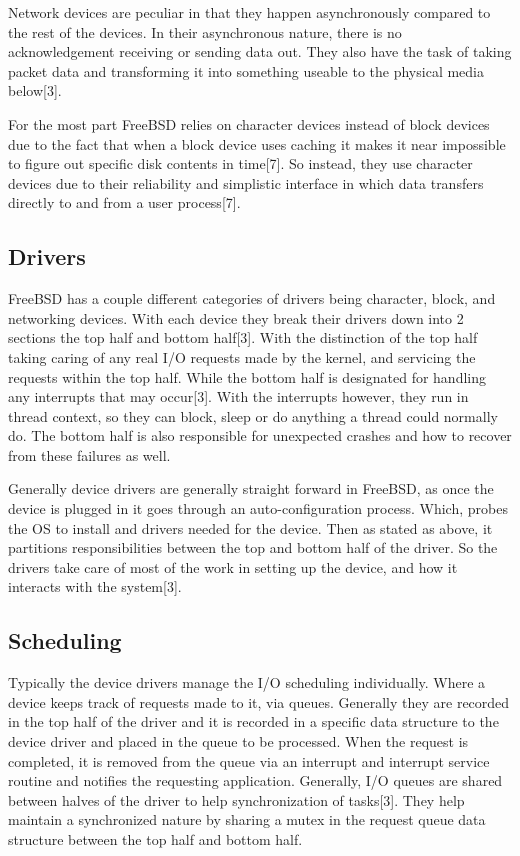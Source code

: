 \documentclass{article}
\begin{document}
    Network devices are peculiar in that they happen asynchronously compared to the rest of the devices. In their asynchronous nature, there is no acknowledgement receiving or sending data out. They also have the task of taking packet data and transforming it into something useable to the physical media below[3].

    For the most part FreeBSD relies on character devices instead of block devices due to the fact that when a block device uses caching it makes it near impossible to figure out specific disk contents in time[7]. So instead, they use character devices due to their reliability and simplistic interface in which data transfers directly to and from a user process[7].
\subsection{Drivers}
    FreeBSD has a couple different categories of drivers being character, block, and networking devices. With each device they break their drivers down into 2 sections the top half and bottom half[3]. With the distinction of the top half taking caring of any real I/O requests made by the kernel, and servicing the requests within the top half. While the bottom half is designated for handling any interrupts that may occur[3]. With the interrupts however, they run in thread context, so they can block, sleep or do anything a thread could normally do. The bottom half is also responsible for unexpected crashes and how to recover from these failures as well.

    Generally device drivers are generally straight forward in FreeBSD, as once the device is plugged in it goes through an auto-configuration process. Which, probes the OS to install and drivers needed for the device. Then as stated as above, it partitions responsibilities between the top and bottom half of the driver. So the drivers take care of most of the work in setting up the device, and how it interacts with the system[3].

\subsection{Scheduling}
    Typically the device drivers manage the I/O scheduling individually. Where a device keeps track of requests made to it, via queues. Generally they are recorded in the top half of the driver and it is recorded in a specific data structure to the device driver and placed in the queue to be processed. When the request is completed, it is removed from the queue via an interrupt and interrupt service routine and notifies the requesting application. Generally, I/O queues are shared between halves of the driver to help synchronization of tasks[3]. They help maintain a synchronized nature by sharing a mutex in the request queue data structure between the top half and bottom half.
\end{document}
